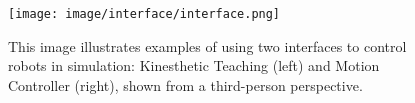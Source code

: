 \begin{figure}[h!]
    \centering
    \texttt{[image: image/interface/interface.png]}
    \caption{This image illustrates examples of using two interfaces to control robots in simulation: Kinesthetic Teaching (left) and Motion Controller (right), shown from a third-person perspective.}
    \label{fig:interface}
\end{figure}